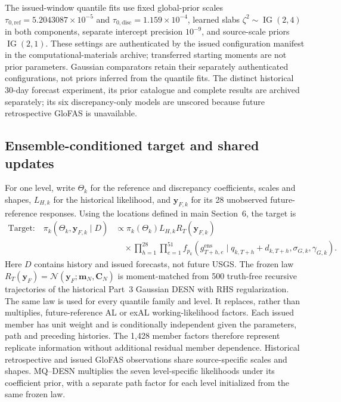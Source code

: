 \documentclass[12pt,letterpaper]{article}
\newcommand{\vect}[1]{\bm{#1}}
\newcommand{\mat}[1]{\bm{#1}}
\newcommand{\Normal}{\mathcal{N}}
\newcommand{\IG}{\operatorname{IG}}
\newcommand{\TableStyle}{\footnotesize\setlength{\tabcolsep}{4pt}\renewcommand{\arraystretch}{1.08}}
\numberwithin{suppalgorithm}{section}
\numberwithin{equation}{section}
\numberwithin{table}{section}
\numberwithin{figure}{section}
\begin{document}
\begin{table}[!htbp]
\centering
\TableStyle
\caption{Selected depth-one GloFAS reservoirs. Maximum response and weather
lags are \(m\) and \(m_z\); selection excludes the final forecast window.}
\label{tab:supp-glofas-search3-specifications}

\end{table}

The issued-window quantile fits use fixed global-prior scales
\(\tau_{0,\mathrm{ref}}=5.2043087\times10^{-5}\) and
\(\tau_{0,\mathrm{disc}}=1.159\times10^{-4}\), learned slabs
\(\zeta^2\sim\IG(2,4)\) in both components, separate intercept
precision \(10^{-9}\), and source-scale priors \(\IG(2,1)\).
These settings are authenticated by the issued configuration manifest in
the computational-materials archive; transferred starting moments are not
prior parameters. Gaussian comparators retain their separately authenticated
configurations, not priors inferred from the quantile fits.
The distinct historical 30-day forecast experiment, its prior catalogue
and complete results are archived separately; its six discrepancy-only
models are unscored because future retrospective GloFAS is unavailable.

\subsection{Ensemble-conditioned target and shared updates}
\label{subsec:glofas_likelihoods}

For one level, write \(\Theta_k\) for the reference and discrepancy
coefficients, scales and shapes, \(L_{H,k}\) for the historical
likelihood, and \(\vect y_{F,k}\) for its 28 unobserved future-reference
responses. Using the locations defined in main Section~6, the target is
\begin{equation}
\begin{aligned}
\text{Target:}\quad
\pi_k(\Theta_k,\vect y_{F,k}\mid D)
&\propto\pi_k(\Theta_k)L_{H,k}R_T(\vect y_{F,k})\\
&\quad\times\prod_{h=1}^{28}\prod_{e=1}^{51}
f_{p_k}(g_{T+h,e}^{\mathrm{ens}}\mid
q_{k,T+h}+d_{k,T+h},\sigma_{G,k},\gamma_{G,k}).
\end{aligned}
\label{eq:supp_glofas_unit_member_target}
\end{equation}
Here \(D\) contains history and issued forecasts, not future USGS.
The frozen law
\(R_T(\vect y_F)=\Normal(\vect y_F;\vect m_N,\mat C_N)\) is
moment-matched from 500 truth-free recursive trajectories of the historical
Part~3 Gaussian DESN with RHS regularization. The same law is used for every
quantile family and level. It replaces, rather than multiplies,
future-reference AL or exAL working-likelihood factors. Each issued member
has unit weight and is conditionally independent given the parameters, path
and preceding histories. The 1,428 member factors therefore represent
replicate information without additional residual member dependence.
Historical retrospective and issued GloFAS observations share
source-specific scales and shapes. MQ--DESN multiplies the seven
level-specific likelihoods under its coefficient prior, with a separate
path factor for each level initialized from the same frozen law.
\end{document}

